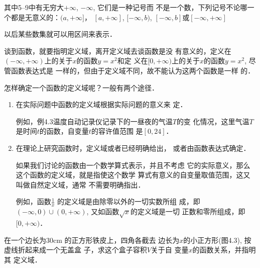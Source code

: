 其中5--9中有无穷大$+\infty$, $-\infty$, 它们是一种记号而
不是一个数，下列记号不论哪一个都是无意义的：$(a,+\infty]$，
$[a,+\infty]$, $[-\infty,b)$, $[-\infty,b]$或$[-\infty,+\infty]$

以后某些数集就可以用区间来表示．

谈到函数，就要指明定义域，离开定义域去谈函数是没
有意义的，定义在$(-\infty,+\infty)$上的关于$x$的函数$y=x^2$和定
义在$[0,+\infty)$上的关于$x$的函数$y=x^2$, 尽管函数表达式是
一样的，但由于定义域不同，故不能认为这两个函数是一样
的．

怎样确定一个函数的定义域呢？一般有两个途径．
\begin{enumerate}
    \item 在实际问题中函数的定义域根据实际问题的意义来
    定．

    例如，例4.3温度自动记录仪记录下的一昼夜的气温$T$的变
    化情况，这里气温$T$是时间$t$的函数，自变量$t$的容许值范围
    是$[0,24]$．

    \item 在理论上研究函数时，定义域或者已经明确给出，
    或者由函数表达式确定．

    如果我们讨论的函数由一个数学算式表示，并且不考虑
    它的实际意义，那么这个函数的定义域，就是指使这个数学
    算式有意义的自变量取值范围，这又叫做自然定义域，通常
    不需要明确指出．

    例如，函数$\frac{1}{x}$
    的定义域是由除零以外的一切实数所组
    成，即$(-\infty,0)\cup(0,+\infty)$, 又如函数$\sqrt{x}$的定义域是一切
    正数和零所组成，即$[0,+\infty)$．
\end{enumerate}


\begin{example}
 在一个边长为30cm
的正方形铁皮上，四角各截去
边长为$x$的小正方形(图4.3),
按虚线折起来成一个无盖盒
子，求这个盒子容积$V$关于自
变量$x$的函数关系，并指明其
定义域．   
\end{example}

\begin{figure}[htp]
    \centering
{}
    \caption{}
\end{figure}

